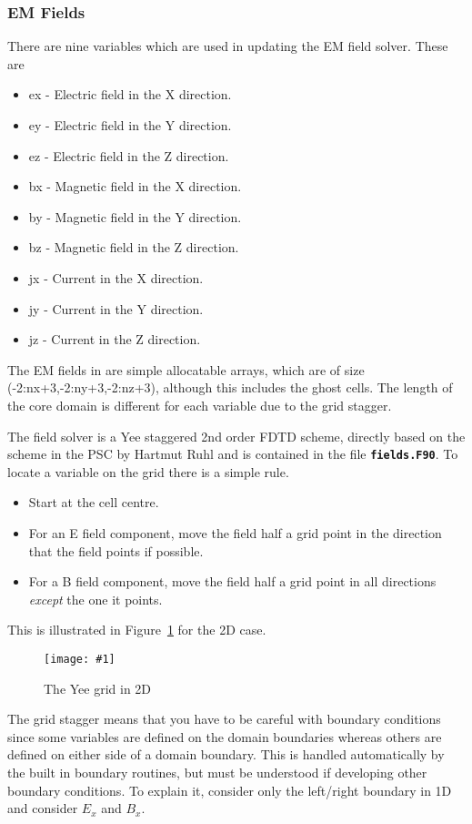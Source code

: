 \documentclass[12pt,a4paper]{article}
\newcommand{\inlinecode}[1]{{\color{warwickred} \bf\texttt{#1}}}
\newcommand{\EPOCH}{{\color{warwickdark}\fontfamily{phv}\selectfont{EPOCH}}}
\newcommand{\captionedimage}[3]
  {{\begin{figure}[hbt!]\centering\texttt{[image: \#1]}\caption{#3}\label{#2}
    \end{figure}}}
\begin{document}
\subsubsection{EM Fields}
There are nine variables which are used in updating the EM field solver. These
are
\begin{itemize}
\item ex - Electric field in the X direction.
\item ey - Electric field in the Y direction.
\item ez - Electric field in the Z direction.
\item bx - Magnetic field in the X direction.
\item by - Magnetic field in the Y direction.
\item bz - Magnetic field in the Z direction.
\item jx - Current in the X direction.
\item jy - Current in the Y direction.
\item jz - Current in the Z direction.
\end{itemize}
The EM fields in {\EPOCH} are simple allocatable arrays, which are of size
(-2:nx+3,-2:ny+3,-2:nz+3), although this includes the ghost cells. The length of
the core domain is different for each variable due to the grid stagger.

The {\EPOCH} field solver is a Yee staggered 2nd order FDTD scheme, directly
based on the scheme in the PSC by Hartmut Ruhl and is contained in the file
\inlinecode{fields.F90}. To locate a variable on the grid there is a simple
rule.
\begin{itemize}
\item Start at the cell centre.
\item For an E field component, move the field half a grid point in the
  direction that the field points if possible.
\item For a B field component, move the field half a grid point in all
  directions {\it except} the one it points.
\end{itemize}
This is illustrated in Figure~\ref{yeegrid} for the 2D case.\\

\captionedimage{./images/stagger}{yeegrid}{The Yee grid in 2D}


The grid stagger means that you have to be careful with boundary conditions
since some variables are defined on the domain boundaries whereas others are
defined on either side of a domain boundary. This is handled automatically by
the built in boundary routines, but must be understood if developing other
boundary conditions. To explain it, consider only the left/right boundary in 1D
and consider $E_x$ and $B_x$.\\
\end{document}
